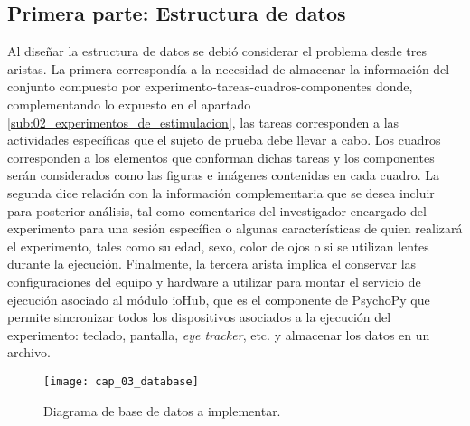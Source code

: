 \documentclass[\main/main.tex]{subfiles}
\begin{document}
		\subsection{Primera parte: Estructura de datos}
		\label{sub:03_estructura_datos}
			Al diseñar la estructura de datos se debió considerar el problema desde tres aristas. La primera correspondía a la necesidad de almacenar la información del conjunto compuesto por experimento-tareas-cuadros-componentes donde, complementando lo expuesto en el apartado \ref{sub:02_experimentos_de_estimulacion}, las tareas corresponden a las actividades específicas que el sujeto de prueba debe llevar a cabo. Los cuadros corresponden a los elementos que conforman dichas tareas y los componentes serán considerados como las figuras e imágenes contenidas en cada cuadro. La segunda dice relación con la información complementaria que se desea incluir para posterior análisis, tal como comentarios del investigador encargado del experimento para una sesión específica o algunas características de quien realizará el experimento, tales como su edad, sexo, color de ojos o si se utilizan lentes durante la ejecución. Finalmente, la tercera arista implica el conservar las configuraciones del equipo y hardware a utilizar para montar el servicio de ejecución asociado al módulo ioHub, que es el componente de PsychoPy que permite sincronizar todos los dispositivos asociados a la ejecución del experimento: teclado, pantalla, \textit{eye tracker}, etc. y almacenar los datos en un archivo. 
			\begin{figure}[H]
				\centering
				\texttt{[image: cap\_03\_database]}
				\caption{Diagrama de base de datos a implementar.}
				\label{fig:03_database}
			\end{figure} 
\end{document}

